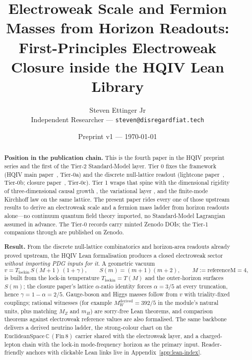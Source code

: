 \documentclass[11pt]{article}
\title{Electroweak Scale and Fermion Masses from Horizon Readouts:\\[0.35em]
First-Principles Electroweak Closure inside the HQIV Lean Library}
\author{Steven Ettinger Jr\\
{\small Independent Researcher --- \texttt{steven@disregardfiat.tech}}}
\date{Preprint v1 --- \today}
\begin{document}
\maketitle

\begin{abstract}
\noindent\textbf{Position in the publication chain.}
This is the fourth paper in the HQIV preprint series and the
first of the Tier-2 Standard-Model layer. Tier 0 fixes the
framework (HQIV main paper~\cite{ettinger2026hqiv}, Tier-0a) and
the discrete null-lattice readout (lightcone
paper~\cite{hqiv-lightcone-paper}, Tier-0b; closure
paper~\cite{hqiv-so8-paper}, Tier-0c). Tier 1 wraps that spine
with the dimensional rigidity of three-dimensional causal growth
\cite{hqiv-3d-growth-paper}, the variational layer
\cite{hqiv-oct-action-paper}, and the finite-mode Kirchhoff law
\cite{hqiv-kirchhoff-paper} on the same lattice. The present
paper rides every one of those upstream results to derive an
electroweak scale and a fermion mass ladder from horizon
readouts alone---no continuum quantum field theory imported, no
Standard-Model Lagrangian assumed in advance. The Tier-0 records
carry minted Zenodo DOIs; the Tier-1 companions through
\cite{hqiv-kirchhoff-paper} are published on Zenodo.

\noindent\textbf{Result.}
From the discrete null-lattice combinatorics and horizon-area
readouts already proved upstream, the HQIV Lean formalisation
produces a closed electroweak sector \emph{without importing PDG
inputs for it}. A geometric vacuum
\[
  v=T_{\mathrm{lockin}}\,S(M{+}1)\,(1+\gamma),
  \qquad
  S(m)=(m+1)(m+2),
  \qquad
  M:=\mathrm{referenceM}=4,
\]
is built from the lock-in temperature
$T_{\mathrm{lockin}}=T(M)$ and the outer-horizon surfaces
$S(m)$; the closure paper's lattice $\alpha$-ratio identity
forces $\alpha=3/5$ at every truncation, hence
$\gamma=1-\alpha=2/5$. Gauge-boson and Higgs masses follow from
$v$ with triality-fixed couplings; rational witnesses (for
example $M_W^{\mathrm{derived}}=392/5$ in the module's natural
units, plus matching $M_Z$ and $m_H$) are sorry-free Lean
theorems, and comparison theorems against electroweak reference
values \cite{pdg2024} are also formalised. The same backbone
delivers a derived neutrino ladder, the strong-colour chart on
the $\mathrm{EuclideanSpace}\,\mathbb{C}\,(\mathrm{Fin}\,8)$
carrier shared with the electroweak layer, and a charged-lepton
chain with the lock-in mode-frequency horizon as the primary
input. Reader-friendly anchors with clickable Lean links live in
Appendix~\ref{app:lean-index}.


\end{abstract}
\end{document}

